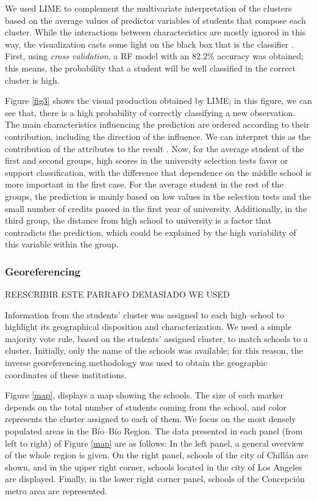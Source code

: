 \documentclass[5p,authoryear,preprint,12pt]{elsarticle}
\begin{document}
We used LIME to complement the multivariate interpretation of the clusters based on the average values of predictor variables of students that compose each cluster. While the interactions between characteristics are mostly ignored in this way, the visualization casts some light on the black box that is the classifier \citep{amrit2017identifying}. First, using \emph{cross validation}, a RF model with an $82.2\%$ accuracy was obtained; this means, the probability that a student will be well classified in the correct cluster is high. 

Figure \ref{fig3} shows the visual production obtained by LIME; in this figure, we can see that, there is a high probability of correctly classifying a new observation. The main characteristics influencing the prediction are ordered according to their contribution, including the direction of the influence.  We can interpret this as the contribution of the attributes to the result \citep{amrit2017identifying}. Now, for the average student of the first and second groups, high scores in the university selection tests favor or support classification, with the difference that dependence on the middle school is more important in the first case. For the average student in the rest of the groups, the prediction is mainly based on low values in the selection tests and the small number of credits passed in the first year of university. Additionally, in the third group, the distance from high school to university is a factor that contradicts the prediction, which could be explained by the high variability of this variable within the group.

\subsubsection{Georeferencing}

REESCRIBIR ESTE PARRAFO DEMASIADO WE USED

Information from the students' cluster was assigned to each high--school to highlight its geographical disposition and characterization. We used a simple majority vote rule, based on the students' assigned cluster, to match schools to a cluster. Initially, only the name of the schools was available; for this reason, the inverse georeferencing methodology was used to obtain the geographic coordinates of these institutions. 

Figure \ref{map}, displays a map showing the schools. The size of each marker depends on the total number of students coming from the school, and color represents the cluster assigned to each of them. We focus on the most densely populated areas in the Bío--Bío Region. The data presented in each panel (from left to right) of Figure \ref{map} are as follows: In the left panel, a general overview of the whole region is given. On the right panel, schools of the city of Chill\'an are shown, and in the upper right corner, schools located in the city of Los Angeles are displayed. Finally, in the lower right corner panel, schools of the Concepción metro area are represented.
\end{document}
